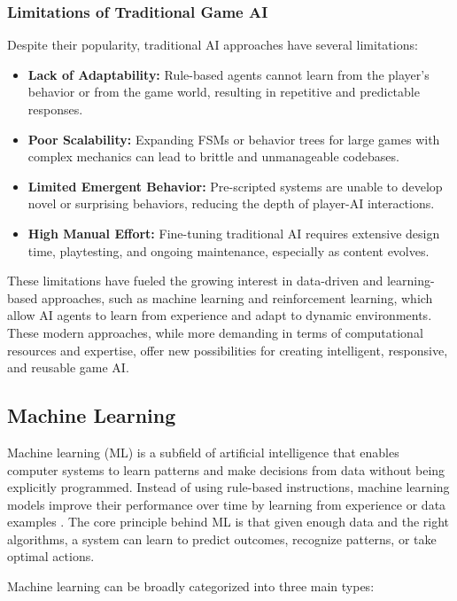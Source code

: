 \documentclass[12pt,oneside,openright,a4paper]{cpe-english-project}
\begin{document}
\subsubsection{Limitations of Traditional Game AI}
Despite their popularity, traditional AI approaches have several limitations:
\begin{itemize}
\item \textbf{Lack of Adaptability:} Rule-based agents cannot learn from the player’s behavior or from the game world, resulting in repetitive and predictable responses.
\item \textbf{Poor Scalability:} Expanding FSMs or behavior trees for large games with complex mechanics can lead to brittle and unmanageable codebases.
\item \textbf{Limited Emergent Behavior:} Pre-scripted systems are unable to develop novel or surprising behaviors, reducing the depth of player-AI interactions.
\item \textbf{High Manual Effort:} Fine-tuning traditional AI requires extensive design time, playtesting, and ongoing maintenance, especially as content evolves.
\end{itemize}
These limitations have fueled the growing interest in data-driven and learning-based approaches, such as machine learning and reinforcement learning, which allow AI agents to learn from experience and adapt to dynamic environments. These modern approaches, while more demanding in terms of computational resources and expertise, offer new possibilities for creating intelligent, responsive, and reusable game AI.\par

\subsection{Machine Learning}

Machine learning (ML) is a subfield of artificial intelligence that enables computer systems to learn patterns and make decisions from data without being explicitly programmed. Instead of using rule-based instructions, machine learning models improve their performance over time by learning from experience or data examples \cite{mitchell1997machine}. The core principle behind ML is that given enough data and the right algorithms, a system can learn to predict outcomes, recognize patterns, or take optimal actions.

Machine learning can be broadly categorized into three main types:
\end{document}
